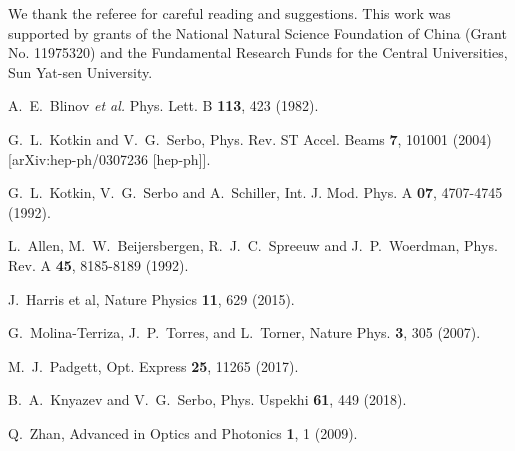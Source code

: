 \documentclass[aps,prd,longbibliography,nofootinbib,amsthm,amsmath,amssymb,amsfonts,notitlepage]{revtex4-1}
\begin{document}
We thank the referee for careful reading and suggestions.
This work was supported by grants of the National Natural Science Foundation of China 
(Grant No. 11975320) and the Fundamental Research Funds for the Central Universities, Sun Yat-sen University.

\begin{thebibliography}{99}

A.~E.~Blinov \textit{et al.}
Phys. Lett. B \textbf{113}, 423 (1982).

G.~L.~Kotkin and V.~G.~Serbo,
Phys. Rev. ST Accel. Beams \textbf{7}, 101001 (2004)
[arXiv:hep-ph/0307236 [hep-ph]].

G.~L.~Kotkin, V.~G.~Serbo and A.~Schiller,
Int. J. Mod. Phys. A \textbf{07}, 4707-4745 (1992).

L.~Allen, M.~W.~Beijersbergen, R.~J.~C.~Spreeuw and J.~P.~Woerdman,
Phys. Rev. A \textbf{45}, 8185-8189 (1992).

J.~Harris et al,
Nature Physics {\bf 11}, 629 (2015).

G.~Molina-Terriza, J.~P.~Torres, and L.~Torner,
Nature Phys. {\bf 3}, 305 (2007).

M.~J.~Padgett,
Opt. Express {\bf 25}, 11265 (2017).

B.~A.~Knyazev and V.~G.~Serbo,
Phys. Uspekhi {\bf 61}, 449 (2018).

Q.~Zhan,
Advanced in Optics and Photonics {\bf 1}, 1 (2009).


\end{thebibliography}
\end{document}
